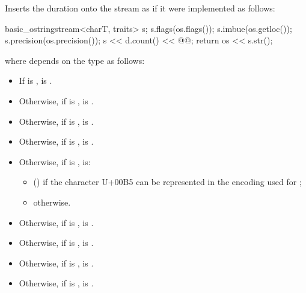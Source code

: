 \begin{itemdescr}
\pnum
\effects
Inserts the duration  onto the stream 
as if it were implemented as follows:
\begin{codeblock}
basic_ostringstream<charT, traits> s;
s.flags(os.flags());
s.imbue(os.getloc());
s.precision(os.precision());
s << d.count() << @@;
return os << s.str();
\end{codeblock}
where 
depends on the type  as follows:

\begin{itemize}
\item
If  is ,
 is .

\item
Otherwise, if  is ,
 is .

\item
Otherwise, if  is ,
 is .

\item
Otherwise, if  is ,
 is .

\item
Otherwise, if  is ,
 is:
\begin{itemize}
\item {} () if the character U+00B5 can be represented in the encoding used for ;
\item {} otherwise.
\end{itemize}

\item
Otherwise, if  is ,
 is .

\item
Otherwise, if  is ,
 is .

\item
Otherwise, if  is ,
 is .

\item
Otherwise, if  is ,
 is .


\end{itemize}
\end{itemdescr}
